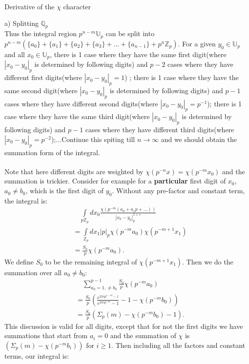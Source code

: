 \documentclass[12pt]{article}
\begin{document}
\begin{section}{Derivative of the $\chi$ character}
\begin{paragraph}{a) Splitting $\mathbb{Q}_p$}
\\Thus the integral region $p^{n-m}\mathbb{U}_p$ can be split into $p^{n-m}(\{a_0\}+\{a_1\}+\{a_2\}+\{a_3\}+...+\{a_{n-1}\}+p^n\mathbb{Z}_p)$. For a given $y_0\in\mathbb{U}_p$ and all $x_0\in\mathbb{U}_p$, there is 1 case where they have the same first digit(where $|x_0-y_0|_p$ is determined by following digits) and $p-2$ cases where they have different first digits(where $|x_0-y_0|_p=1$) ; there is 1 case where they have the same second digit(where $|x_0-y_0|_p$ is determined by following digits) and $p-1$ cases where they have different second digits(where $|x_0-y_0|_p=p^{-1}$); there is 1 case where they have the same third digit(where $|x_0-y_0|_p$ is determined by following digits) and $p-1$ cases where they have different third digits(where $|x_0-y_0|_p=p^{-2}$);...Continue this spiting till $n\to\infty$ and we should obtain the summation form of the integral. \\
\\Note that here different digits are weighted by $\chi(p^{-n}x)=\chi(p^{-m}x_0)$ and the summation is trickier. Consider for example for a \textbf{particular} first digit of $x_0$, $a_0\neq b_0$, which is the first digit of $y_0$. Without any pre-factor and constant term, the integral is:
\begin{equation}
\begin{split}
&\quad \int\limits_{p\mathbb{Z}_p}dx_0\frac{\chi(p^{-m}(a_0+a_1 p+...))}{|x_0-y_0|_p^{1+s}} \\
&=\int\limits_{\mathbb{Z}_p}dx_1|p|_p\chi(p^{-m}a_0)\chi(p^{-m+1}x_1)\\
&=\frac{S_0}{p} \chi(p^{-m}a_0).
\end{split}
\end{equation} 
We define $S_0$ to be the remaining integral of $\chi(p^{-m+1}x_1)$. Then we do the summation over all $a_0\neq b_0$:
\begin{equation}
\begin{split}
&\quad \sum\limits^{p-1}_{a_0=1,\neq b_0} \frac{S_0}{p} \chi(p^{-m}a_0) \\
&=\frac{S_0}{p}(\frac{e^{2\pi i p^{1-m}-1}}{e^{2\pi i p^{-m}}-1}-1-\chi(p^{-m}b_0)) \\
&=\frac{S_0}{p}(\Sigma_p(m)-\chi(p^{-m}b_0)-1).
\end{split}
\end{equation}
This discussion is valid for all digits, except that for not the first digits we have summations that start from $a_i=0$ and the summation of $\chi$ is $(\Sigma_p(m)-\chi(p^{-m}b_i))$ for $i\geq 1$. Then including all the factors and constant terms, our integral is:

\end{paragraph}
\end{section}
\end{document}
